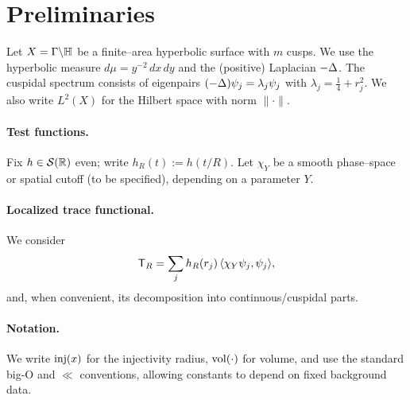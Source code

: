 \section{Preliminaries}\label{sec:prelim}

Let $X=\Gamma\backslash\mathbb{H}$ be a finite–area hyperbolic surface with $m$ cusps.
We use the hyperbolic measure $d\mu=y^{-2}\,dx\,dy$ and the (positive) Laplacian $-\Delta$.
The cuspidal spectrum consists of eigenpairs $(-\Delta)\psi_j=\lambda_j\psi_j$ with $\lambda_j=\tfrac14+r_j^2$.
We also write $L^2(X)$ for the Hilbert space with norm $\|\cdot\|$.

\paragraph{Test functions.}
Fix $h\in\mathcal S(\mathbb{R})$ even; write $h_R(t):=h(t/R)$.
Let $\chi_Y$ be a smooth phase–space or spatial cutoff (to be specified), depending on a parameter $Y$.

\paragraph{Localized trace functional.}
We consider
\[
  \mathsf{T}_R = \sum_j h_R(r_j)\,\langle \chi_Y \psi_j,\psi_j\rangle,
\]
and, when convenient, its decomposition into continuous/cuspidal parts.

\paragraph{Notation.}
We write $\mathrm{inj}(x)$ for the injectivity radius, $\operatorname{vol}(\cdot)$ for volume,
and use the standard big-O and $\ll$ conventions, allowing constants to depend on fixed background data.
